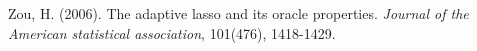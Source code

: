 \documentclass[paper=a4, fontsize=11pt]{scrartcl} %
\numberwithin{equation}{section} %
\begin{document}
\begin{thebibliography}{1}

 Zou, H. (2006). The adaptive lasso and its oracle properties. \emph{Journal of the American statistical association}, 101(476), 1418-1429.


\end{thebibliography}

\end{document}
